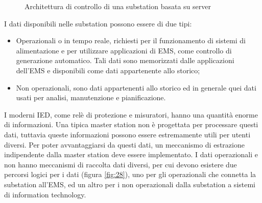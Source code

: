 \begin{figure}[h] 
\caption{Architettura di controllo di una substation basata su server}\label{fig:27}
\end{figure}

I dati disponibili nelle substation possono essere di due tipi:
\begin{itemize}
	\item Operazionali o in tempo reale, richiesti per il funzionamento di sistemi di alimentazione e per utilizzare applicazioni di EMS, come controllo di generazione automatico. Tali dati sono memorizzati dalle applicazioni dell'EMS e disponibili come dati appartenente allo storico;
	\item Non operazionali, sono dati appartenenti allo storico ed in generale quei dati usati per analisi, manutenzione e pianificazione. 
\end{itemize} 
I moderni IED, come relè di protezione e misuratori, hanno una quantità enorme di informazioni. Una tipica master station non è progettata per processare questi dati, tuttavia queste informazioni possono essere estremamente utili per utenti diversi. Per poter avvantaggiarsi da questi dati, un meccanismo di estrazione indipendente dalla master station deve essere implementato. I dati operazionali e non hanno meccanismi di raccolta dati diversi, per cui devono esistere due percorsi logici per i dati (figura \ref{fig:28}), uno per gli operazionali che connetta la substation all'EMS, ed un altro per i non operazionali dalla substation a sistemi di information technology. 

